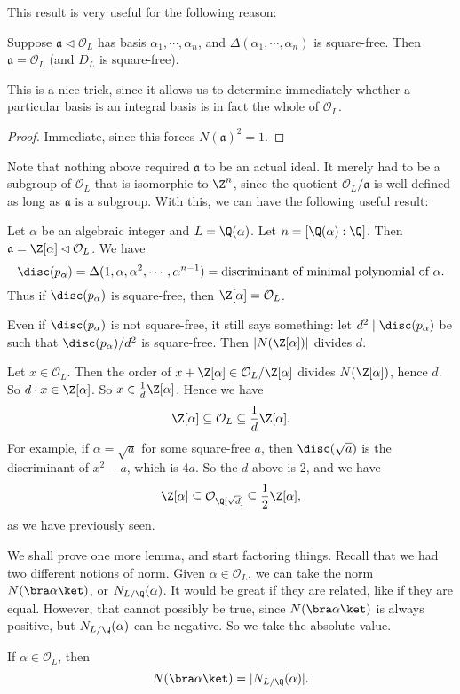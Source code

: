 \documentclass[a4paper]{article}
\begin{document}
This result is very useful for the following reason:
\begin{cor}
  Suppose $\mathfrak{a} \lhd \mathcal{O}_L$ has basis $\alpha_1, \cdots, \alpha_n$, and $\Delta(\alpha_1, \cdots, \alpha_n)$ is square-free. Then $\mathfrak{a} = \mathcal{O}_L$ (and $D_L$ is square-free).
\end{cor}
This is a nice trick, since it allows us to determine immediately whether a particular basis is an integral basis is in fact the whole of $\mathcal{O}_L$.

\begin{proof}
  Immediate, since this forces $N(\mathfrak{a})^2 = 1$.
\end{proof}

Note that nothing above required $\mathfrak{a}$ to be an actual ideal. It merely had to be a subgroup of $\mathcal{O}_L$ that is isomorphic to $\Z^n$, since the quotient $\mathcal{O}_L/\mathfrak{a}$ is well-defined as long as $\mathfrak{a}$ is a subgroup. With this, we can have the following useful result:

\begin{eg}
  Let $\alpha$ be an algebraic integer and $L = \Q(\alpha)$. Let $n = [\Q(\alpha):\Q]$. Then $\mathfrak{a} = \Z[\alpha] \lhd \mathcal{O}_L$. We have
  \[
    \disc(p_\alpha) = \Delta(1, \alpha, \alpha^2, \cdots, \alpha^{n - 1}) = \text{discriminant of minimal polynomial of }\alpha.
  \]
  Thus if $\disc(p_\alpha)$ is square-free, then $\Z[\alpha] = \mathcal{O}_L$.

  Even if $\disc(p_\alpha)$ is not square-free, it still says something: let $d^2 \mid \disc(p_\alpha)$ be such that $\disc(p_\alpha)/d^2$ is square-free. Then $|N(\Z[\alpha])|$ divides $d$.

  Let $x \in \mathcal{O}_L$. Then the order of $x + \Z[\alpha] \in \mathcal{O}_L/\Z[\alpha]$ divides $N(\Z[\alpha])$, hence $d$. So $d \cdot x \in \Z[\alpha]$. So $x \in \frac{1}{d} \Z[\alpha]$. Hence we have
  \[
    \Z[\alpha] \subseteq \mathcal{O}_L \subseteq \frac{1}{d} \Z[\alpha].
  \]
  For example, if $\alpha = \sqrt{a}$ for some square-free $a$, then $\disc(\sqrt{a})$ is the discriminant of $x^2 - a$, which is $4a$. So the $d$ above is $2$, and we have
  \[
    \Z[\alpha] \subseteq \mathcal{O}_{\Q[\sqrt{d}]} \subseteq \frac{1}{2} \Z[\alpha],
  \]
  as we have previously seen.

\end{eg}

We shall prove one more lemma, and start factoring things. Recall that we had two different notions of norm. Given $\alpha \in \mathcal{O}_L$, we can take the norm $N(\bra \alpha\ket)$, or $N_{L/\Q}(\alpha)$. It would be great if they are related, like if they are equal. However, that cannot possibly be true, since $N(\bra \alpha\ket)$ is always positive, but $N_{L/\Q}(\alpha)$ can be negative. So we take the absolute value.
\begin{lemma}
  If $\alpha \in \mathcal{O}_L$, then
  \[
    N(\bra \alpha\ket) = |N_{L/\Q}(\alpha)|.
  \]
\end{lemma}
\end{document}
